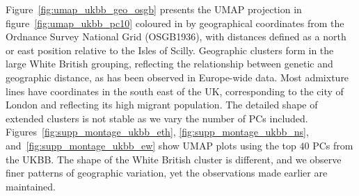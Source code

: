 \documentclass[12pt]{pnas-new}
\begin{document}
Figure~\ref{fig:umap_ukbb_geo_osgb} presents the UMAP projection in figure~\ref{fig:umap_ukbb_pc10} coloured in by geographical coordinates from the Ordnance Survey National Grid (OSGB1936), with distances defined as a north or east position relative to the Isles of Scilly. Geographic clusters form in the large White British grouping, reflecting the relationship between genetic and geographic distance, as has been observed in Europe-wide data\cite{novembre2008europe}. Most admixture lines have coordinates in the south east of the UK, corresponding to the city of London and reflecting its high migrant population. The detailed shape of extended clusters is not stable as we vary the number of PCs included. Figures~\ref{fig:supp_montage_ukbb_eth}, \ref{fig:supp_montage_ukbb_ns}, and~\ref{fig:supp_montage_ukbb_ew} show UMAP plots using the top $40$ PCs from the UKBB. The shape of the White British cluster is different, and we observe finer patterns of geographic variation, yet the observations made earlier are maintained.
\end{document}
